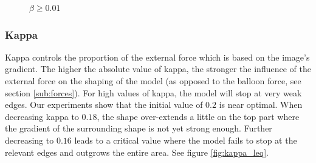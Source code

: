\begin{figure}[!hbt]
\centering   
{}
\caption{$\beta \geq 0.01$}
\label{fig:beta_geq}
\end{figure}

\subsubsection{Kappa}

Kappa controls the proportion of the external force which is based on the image's gradient. The higher the absolute value of kappa, the stronger the influence of the external force on the shaping of the model (as opposed to the balloon force, see section \ref{sub:forces}). For high values of kappa, the model will stop at very weak edges. Our experiments show that the initial value of $0.2$ is near optimal. When decreasing kappa to $0.18$, the shape over-extends a little on the top part where the gradient of the surrounding shape is not yet strong enough. Further decreasing to $0.16$ leads to a critical value where the model fails to stop at the relevant edges and outgrows the entire area. See figure \ref{fig:kappa_leq}.

